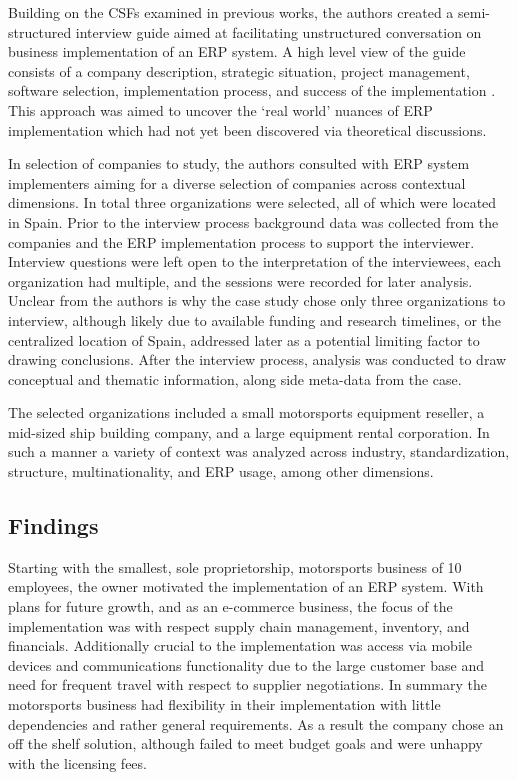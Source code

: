 \documentclass{article}
\begin{document}
Building on the CSFs examined in previous works, the authors created a semi-structured interview guide aimed at facilitating unstructured conversation on business implementation of an ERP system.
A high level view of the guide consists of a company description, strategic situation, project management, software selection, implementation process, and success of the implementation \cite{integrated_erp}.
This approach was aimed to uncover the `real world' nuances of ERP implementation which had not yet been discovered via theoretical discussions.

In selection of companies to study, the authors consulted with ERP system implementers aiming for a diverse selection of companies across contextual dimensions.
In total three organizations were selected, all of which were located in Spain.
Prior to the interview process background data was collected from the companies and the ERP implementation process to support the interviewer.
Interview questions were left open to the interpretation of the interviewees, each organization had multiple, and the sessions were recorded for later analysis.
Unclear from the authors is why the case study chose only three organizations to interview, although likely due to available funding and research timelines, or the centralized location of Spain, addressed later as a potential limiting factor to drawing conclusions.
After the interview process, analysis was conducted to draw conceptual and thematic information, along side meta-data from the case.

The selected organizations included a small motorsports equipment reseller, a mid-sized ship building company, and a large equipment rental corporation.
In such a manner a variety of context was analyzed across industry, standardization, structure, multinationality, and ERP usage, among other dimensions.

\subsection{Findings}
Starting with the smallest, sole proprietorship, motorsports business of 10 employees, the owner motivated the implementation of an ERP system.
With plans for future growth, and as an e-commerce business, the focus of the implementation was with respect supply chain management, inventory, and financials.
Additionally crucial to the implementation was access via mobile devices and communications functionality due to the large customer base and need for frequent travel with respect to supplier negotiations.
In summary the motorsports business had flexibility in their implementation with little dependencies and rather general requirements.
As a result the company chose an off the shelf solution, although failed to meet budget goals and were unhappy with the licensing fees.
\end{document}
